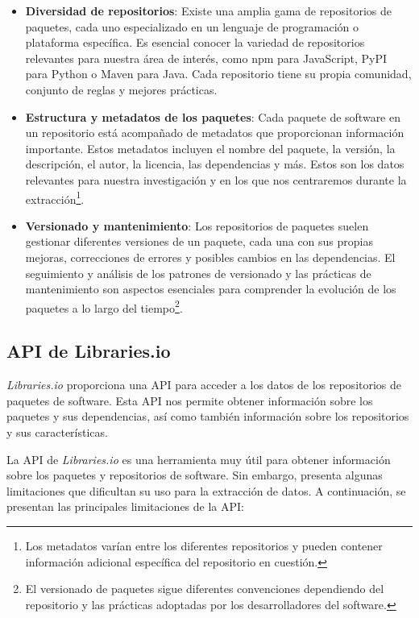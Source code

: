 \begin{itemize}
    \item \textbf{Diversidad de repositorios}: Existe una amplia gama de repositorios de paquetes,
          cada uno especializado en un lenguaje de programación o plataforma específica. Es esencial
          conocer la variedad de repositorios relevantes para nuestra área de interés, como npm para JavaScript,
          PyPI para Python o Maven para Java. Cada repositorio tiene su propia comunidad, conjunto de reglas
          y mejores prácticas.
    \item \textbf{Estructura y metadatos de los paquetes}: Cada paquete de software en un repositorio
          está acompañado de metadatos que proporcionan información importante. Estos metadatos incluyen el
          nombre del paquete, la versión, la descripción, el autor, la licencia, las dependencias y más.
          Estos son los datos relevantes para nuestra investigación y en los que nos centraremos durante
          la extracción\footnote{Los metadatos varían entre los diferentes repositorios y pueden contener
              información adicional específica del repositorio en cuestión.}.
    \item \textbf{Versionado y mantenimiento}: Los repositorios de paquetes suelen gestionar diferentes
          versiones de un paquete, cada una con sus propias mejoras, correcciones de errores y posibles cambios
          en las dependencias. El seguimiento y análisis de los patrones de versionado y las prácticas de
          mantenimiento son aspectos esenciales para comprender la evolución de los paquetes a lo largo del
          tiempo\footnote{El versionado de paquetes sigue diferentes convenciones dependiendo del repositorio
              y las prácticas adoptadas por los desarrolladores del software.}.
\end{itemize}

\subsection{API de Libraries.io}

\textit{Libraries.io} proporciona una API para acceder a los datos de los repositorios de paquetes
de software. Esta API nos permite obtener información sobre los paquetes y sus dependencias,
así como también información sobre los repositorios y sus características.

La API de \textit{Libraries.io} es una herramienta muy útil para obtener información sobre los
paquetes y repositorios de software. Sin embargo, presenta algunas limitaciones que dificultan
su uso para la extracción de datos. A continuación, se presentan las principales limitaciones
de la API:


